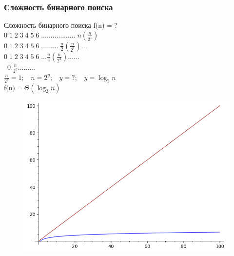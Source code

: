 \documentclass[russian, 12pt]{beamer}
\begin{document}
\begin{frame}[fragile]
\frametitle{Сложность бинарного поиска}
Сложность бинарного поиска f(n) = ?\\[0.3cm] \pause
$0\; 1\; 2\; 3\; 4\; 5\; 6\; \dots\dots\dots\dots\dots\dots \; n\left(\frac{n}{2^1}\right) $\\[0.3cm] \pause
$0\; 1\; 2\; 3\; 4\; 5\; 6\; \dots\dots\dots \;\frac{n}{2}\left(\frac{n}{2^1}\right)\dots$\\[0.3cm] \pause
$0\; 1\; 2\; 3\; 4\; 5\; 6\; \dots \frac{n}{4}\left(\frac{n}{2^2}\right)\dots\dots$\\[0.3cm] \
$0\;\frac{n}{2^y}\dots\dots\dots$\\[0.3cm] \pause
$\frac{n}{2^y} = 1;$\pause
$\;\;n = 2^y;$\pause
$\;\;y = ?;$\pause
$\;\;\boxed{y = \log_2n}$\\[0.3cm]\pause
$\boxed{\text{f(n)} = \Theta(\log_2n)}$
\end{frame}
\begin{frame}
\begin{figure}
  \includegraphics[width=\linewidth]{img/lin_log.png}
\end{figure}
\end{frame}
\end{document}
